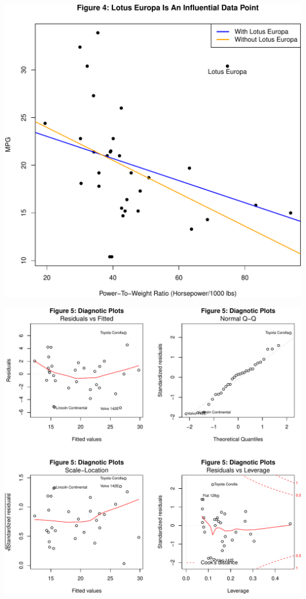 \documentclass[]{article}
\begin{document}
\includegraphics{mtcars_files/figure-latex/scatterplot3-1.pdf}

\includegraphics{mtcars_files/figure-latex/diagnostic-1.pdf}
\end{document}
